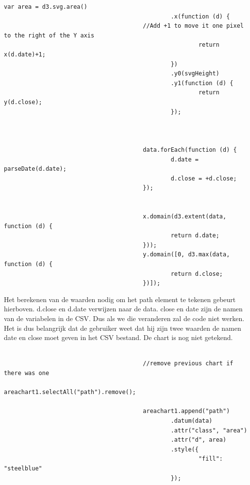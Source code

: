 \begin{lstlisting}[gobble=24]
                                        var area = d3.svg.area()
                                                .x(function (d) {
										//Add +1 to move it one pixel to the right of the Y axis
                                                        return x(d.date)+1;
                                                })
                                                .y0(svgHeight)
                                                .y1(function (d) {
                                                        return y(d.close);
                                                });



                                        data.forEach(function (d) {
                                                d.date = parseDate(d.date);
                                                d.close = +d.close;
                                        });


                                        x.domain(d3.extent(data, function (d) {
                                                return d.date;
                                        }));
                                        y.domain([0, d3.max(data, function (d) {
                                                return d.close;
                                        })]);
\end{lstlisting}

Het berekenen van de waarden nodig om het path element te tekenen gebeurt hierboven. d.close en d.date verwijzen naar de data. close en date zijn de namen van de variabelen in de CSV. Dus als we die veranderen zal de code niet werken. Het is dus belangrijk dat de gebruiker weet dat hij zijn twee waarden de namen date en close moet geven in het CSV bestand. De chart is nog niet getekend.

\begin{lstlisting}[gobble=24]

                                        //remove previous chart if there was one
                                        areachart1.selectAll("path").remove();

                                        areachart1.append("path")
                                                .datum(data)
                                                .attr("class", "area")
                                                .attr("d", area)
                                                .style({
                                                        "fill": "steelblue"
                                                });
\end{lstlisting}

